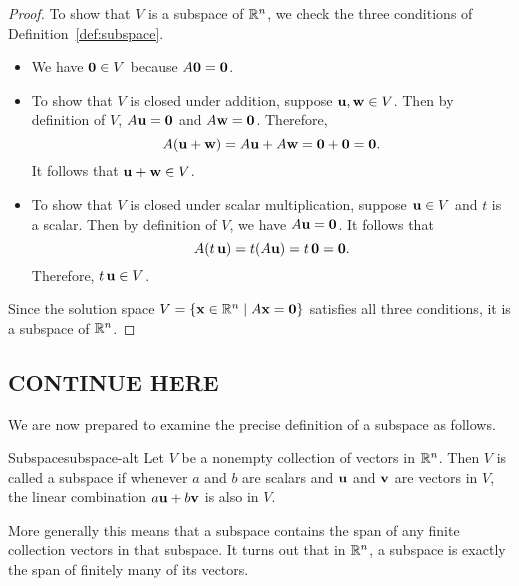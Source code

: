 \begin{proof}
  To show that $V$ is a subspace of $\mathbb{R}^{n}$, we check the three
  conditions of Definition~\ref{def:subspace}.
  \begin{itemize}
  \item We have $\mbox{\bf 0}\in V$ because $A\mbox{\bf 0}=\mbox{\bf 0}$.
  \item To show that $V$ is closed under addition, suppose
    $\mbox{\bf u},\mbox{\bf w}\in V$.  Then by definition of $V$,
    $A\mbox{\bf u}=\mbox{\bf 0}$ and $A\mbox{\bf w}=\mbox{\bf 0}$.  Therefore,
    \begin{equation*}
      A(\mbox{\bf u}+\mbox{\bf w}) = A\mbox{\bf u} + A\mbox{\bf w} = \mbox{\bf 0}+\mbox{\bf 0}
      = \mbox{\bf 0}.
    \end{equation*}
    It follows that $\mbox{\bf u}+\mbox{\bf w}\in V$.
  \item To show that $V$ is closed under scalar multiplication,
    suppose $\mbox{\bf u}\in V$ and $t$ is a scalar. Then by definition of
    $V$, we have $A\mbox{\bf u}=\mbox{\bf 0}$. It follows that 
    \begin{equation*}
      A(t\,\mbox{\bf u}) = t(A\mbox{\bf u}) = t\,\mbox{\bf 0} = \mbox{\bf 0}.
    \end{equation*}
    Therefore, $t\,\mbox{\bf u}\in V$.
  \end{itemize}
  Since the solution space
  $V=\left\{\mbox{\bf x}\in\mathbb{R}^n \mid A\mbox{\bf x} = \mbox{\bf 0}\right\}$ satisfies all
  three conditions, it is a subspace of $\mathbb{R}^n$.
\end{proof}

\newpage
\subsection{CONTINUE HERE}

We are now prepared to examine the precise definition of a subspace as
follows.

\begin{definition}{Subspace}{subspace-alt}
  Let $V$ be a nonempty collection of vectors in $\mathbb{R}^{n}$. Then $V$ is
  called a subspace if whenever $a$
  and $b$ are scalars and $\mbox{\bf u}$ and $\mbox{\bf v}$ are vectors in
  $V$, the linear combination $a \mbox{\bf u}+ b \mbox{\bf v}$ is also in $V$.
\end{definition}

More generally this means that a subspace contains the span of any
finite collection vectors in that subspace. It turns out that in
$\mathbb{R}^{n}$, a subspace is exactly the span of finitely many of its
vectors.

